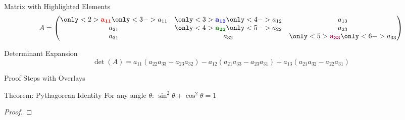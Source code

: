 \documentclass[doctype=beamer, beameraspectratio=169, beamertheme=Madrid, institution=generic]{omnilatex}
\begin{document}
\begin{frame}{Matrix with Highlighted Elements}
  \[
    A = \begin{pmatrix}
      \only<2>{\color{red}\mathbf{a_{11}}} \only<3->{a_{11}} &
      \only<3>{\color{blue}\mathbf{a_{12}}} \only<4->{a_{12}} &
      a_{13} \\
      a_{21} &
      \only<4>{\color{green!50!black}\mathbf{a_{22}}} \only<5->{a_{22}} &
      a_{23} \\
      a_{31} & a_{32} &
      \only<5>{\color{purple}\mathbf{a_{33}}} \only<6->{a_{33}}
    \end{pmatrix}
  \]
  \vspace{1em}
  \begin{block}{Determinant Expansion}
    \[
      \det(A) = a_{11}(a_{22}a_{33} - a_{23}a_{32})
              - a_{12}(a_{21}a_{33} - a_{23}a_{31})
              + a_{13}(a_{21}a_{32} - a_{22}a_{31})
    \]
  \end{block}
\end{frame}

\begin{frame}{Proof Steps with Overlays}
  \begin{block}{Theorem: Pythagorean Identity}
    For any angle $\theta$: $\sin^2\theta + \cos^2\theta = 1$
  \end{block}
  \vspace{1em}
  \begin{proof}
  \end{proof}
\end{frame}
\end{document}
